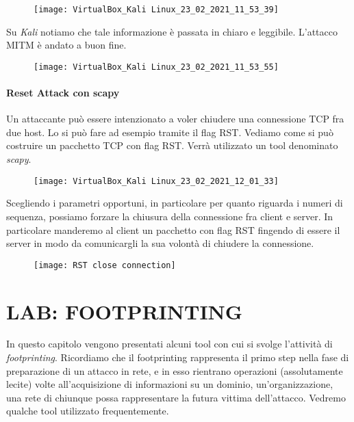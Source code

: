 \documentclass[14pt]{extreport}
\begin{document}
\begin{figure}[H]
\centering
\texttt{[image: VirtualBox\_Kali Linux\_23\_02\_2021\_11\_53\_39]}
\end{figure}
Su \textit{Kali} notiamo che tale informazione è passata in chiaro e leggibile. L'attacco MITM è andato a buon fine.

\begin{figure}[H]
\centering
\texttt{[image: VirtualBox\_Kali Linux\_23\_02\_2021\_11\_53\_55]}
\end{figure}


\subsubsection{Reset Attack con scapy}
Un attaccante può essere intenzionato a voler chiudere una connessione TCP fra due host. Lo si può fare ad esempio tramite il flag RST. Vediamo come si può costruire un pacchetto TCP con flag RST. Verrà utilizzato un tool denominato \textit{scapy}.

\begin{figure}[H]
\centering
\texttt{[image: VirtualBox\_Kali Linux\_23\_02\_2021\_12\_01\_33]}
\end{figure}

Scegliendo i parametri opportuni, in particolare per quanto riguarda i numeri di sequenza, possiamo forzare la chiusura della connessione fra client e server. In particolare manderemo al client un pacchetto con flag RST fingendo di essere il server in modo da comunicargli la sua volontà di chiudere la connessione.


\begin{figure}[H]
\centering
\texttt{[image: RST close connection]}
\end{figure}




\chapter{LAB: FOOTPRINTING}

In questo capitolo vengono presentati alcuni tool con cui si svolge l'attività di \textit{footprinting}. Ricordiamo che il footprinting rappresenta il primo step nella fase di preparazione di un attacco in rete, e in esso rientrano operazioni (assolutamente lecite) volte all'acquisizione di informazioni su un dominio, un'organizzazione, una rete di chiunque possa rappresentare la futura vittima dell'attacco. Vedremo qualche tool utilizzato frequentemente.
\end{document}
